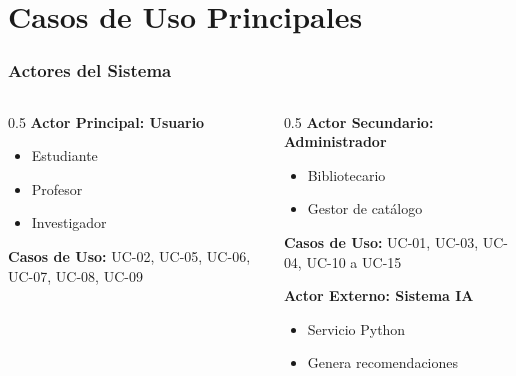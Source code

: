 \documentclass[aspectratio=169]{beamer}
\begin{document}
\section{Casos de Uso Principales}

\begin{frame}
\frametitle{Actores del Sistema}

\begin{columns}
\begin{column}{0.5\textwidth}
\textbf{Actor Principal: Usuario}
\begin{itemize}
\item Estudiante
\item Profesor
\item Investigador
\end{itemize}

\textbf{Casos de Uso:} UC-02, UC-05, UC-06, UC-07, UC-08, UC-09
\end{column}

\begin{column}{0.5\textwidth}
\textbf{Actor Secundario: Administrador}
\begin{itemize}
\item Bibliotecario
\item Gestor de catálogo
\end{itemize}

\textbf{Casos de Uso:} UC-01, UC-03, UC-04, UC-10 a UC-15

\vspace{0.3cm}

\textbf{Actor Externo: Sistema IA}
\begin{itemize}
\item Servicio Python
\item Genera recomendaciones
\end{itemize}
\end{column}
\end{columns}

\vspace{0.5cm}

\begin{center}
\end{center}

\end{frame}
\end{document}
